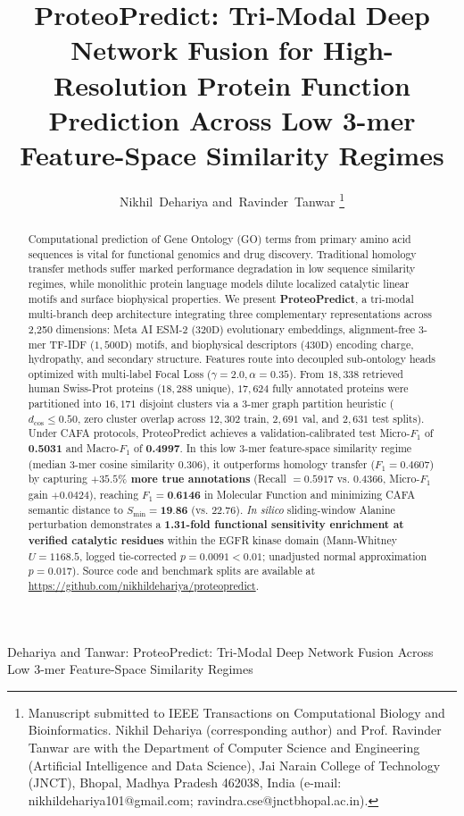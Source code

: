 \documentclass[journal]{IEEEtran}
\begin{document}
\title{ProteoPredict: Tri-Modal Deep Network Fusion for High-Resolution Protein Function Prediction Across Low 3-mer Feature-Space Similarity Regimes}

\author{Nikhil~Dehariya
        and~Ravinder~Tanwar%
\thanks{Manuscript submitted to IEEE Transactions on Computational Biology and Bioinformatics. Nikhil Dehariya (corresponding author) and Prof. Ravinder Tanwar are with the Department of Computer Science and Engineering (Artificial Intelligence and Data Science), Jai Narain College of Technology (JNCT), Bhopal, Madhya Pradesh 462038, India (e-mail: nikhildehariya101@gmail.com; ravindra.cse@jnctbhopal.ac.in).}%
}

%
{Dehariya and Tanwar: ProteoPredict: Tri-Modal Deep Network Fusion Across Low 3-mer Feature-Space Similarity Regimes}

\maketitle

\begin{abstract}
Computational prediction of Gene Ontology (GO) terms from primary amino acid sequences is vital for functional genomics and drug discovery. Traditional homology transfer methods suffer marked performance degradation in low sequence similarity regimes, while monolithic protein language models dilute localized catalytic linear motifs and surface biophysical properties. We present \textbf{ProteoPredict}, a tri-modal multi-branch deep architecture integrating three complementary representations across 2,250 dimensions: Meta AI ESM-2 ($320\text{D}$) evolutionary embeddings, alignment-free $3$-mer TF-IDF ($1,500\text{D}$) motifs, and biophysical descriptors ($430\text{D}$) encoding charge, hydropathy, and secondary structure. Features route into decoupled sub-ontology heads optimized with multi-label Focal Loss ($\gamma = 2.0, \alpha = 0.35$). From $18,338$ retrieved human Swiss-Prot proteins ($18,288$ unique), $17,624$ fully annotated proteins were partitioned into $16,171$ disjoint clusters via a $3$-mer graph partition heuristic ($d_{\cos} \le 0.50$, zero cluster overlap across $12,302$ train, $2,691$ val, and $2,631$ test splits). Under CAFA protocols, ProteoPredict achieves a validation-calibrated test Micro-$F_1$ of \textbf{0.5031} and Macro-$F_1$ of \textbf{0.4997}. In this low $3$-mer feature-space similarity regime (median $3$-mer cosine similarity $0.306$), it outperforms homology transfer ($F_1 = 0.4607$) by capturing \textbf{$+35.5\%$ more true annotations} (Recall $= 0.5917$ vs. $0.4366$, Micro-$F_1$ gain $+0.0424$), reaching $F_1 = \textbf{0.6146}$ in Molecular Function and minimizing CAFA semantic distance to $S_{\min} = \textbf{19.86}$ (vs. $22.76$). \textit{In silico} sliding-window Alanine perturbation demonstrates a \textbf{1.31-fold functional sensitivity enrichment at verified catalytic residues} within the EGFR kinase domain (Mann-Whitney $U = 1168.5$, logged tie-corrected $p = 0.0091 < 0.01$; unadjusted normal approximation $p = 0.017$). Source code and benchmark splits are available at \url{https://github.com/nikhildehariya/proteopredict}.
\end{abstract}
\end{document}
